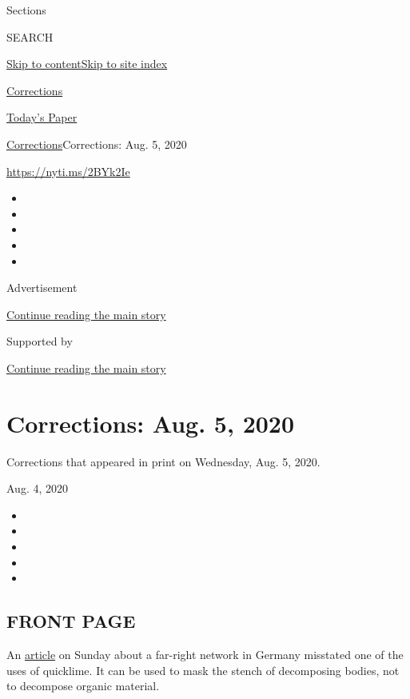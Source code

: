 Sections

SEARCH

\protect\hyperlink{site-content}{Skip to
content}\protect\hyperlink{site-index}{Skip to site index}

\href{https://www.nytimes.com/section/corrections}{Corrections}

\href{https://myaccount.nytimes.com/auth/login?response_type=cookie\&client_id=vi}{}

\href{https://www.nytimes.com/section/todayspaper}{Today's Paper}

\href{/section/corrections}{Corrections}\textbar{}Corrections: Aug. 5,
2020

\url{https://nyti.ms/2BYk2Ie}

\begin{itemize}
\item
\item
\item
\item
\item
\end{itemize}

Advertisement

\protect\hyperlink{after-top}{Continue reading the main story}

Supported by

\protect\hyperlink{after-sponsor}{Continue reading the main story}

\hypertarget{corrections-aug-5-2020}{%
\section{Corrections: Aug. 5, 2020}\label{corrections-aug-5-2020}}

Corrections that appeared in print on Wednesday, Aug. 5, 2020.

Aug. 4, 2020

\begin{itemize}
\item
\item
\item
\item
\item
\end{itemize}

\hypertarget{front-page}{%
\subsection{FRONT PAGE}\label{front-page}}

An
\href{https://www.nytimes.com/2020/08/01/world/europe/germany-nazi-infiltration.html}{article}
on Sunday about a far-right network in Germany misstated one of the uses
of quicklime. It can be used to mask the stench of decomposing bodies,
not to decompose organic material.

